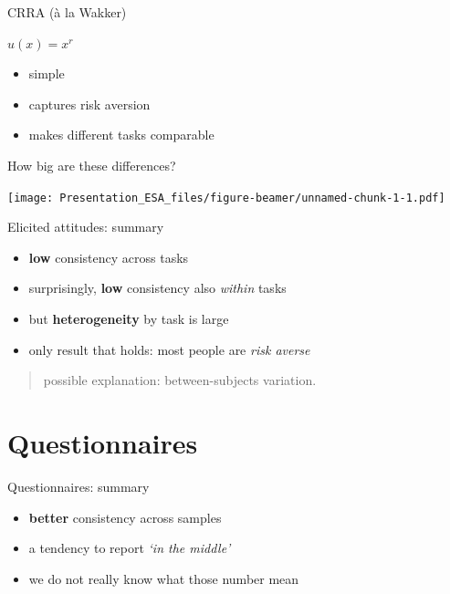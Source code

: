 \documentclass[
  ignorenonframetext,
]{beamer}
\providecommand{\tightlist}{%
  \setlength{\itemsep}{0pt}\setlength{\parskip}{0pt}}
\begin{document}
\begin{frame}{CRRA (à la Wakker)}
\protect\hypertarget{crra-uxe0-la-wakker}{}

\(u(x) = x^r\)

\begin{itemize}
\tightlist
\item
  simple
\item
  captures risk aversion
\item
  makes different tasks comparable
\end{itemize}

\end{frame}

\begin{frame}{How big are these differences?}
\protect\hypertarget{how-big-are-these-differences}{}

\texttt{[image: Presentation\_ESA\_files/figure-beamer/unnamed-chunk-1-1.pdf]}

\end{frame}

\begin{frame}{Elicited attitudes: summary}
\protect\hypertarget{elicited-attitudes-summary}{}

\begin{itemize}
\item
  \textbf{low} consistency across tasks
\item
  surprisingly, \textbf{low} consistency also \emph{within} tasks
\item
  but \textbf{heterogeneity} by task is large
\item
  only result that holds: most people are \emph{risk averse}
\end{itemize}

\begin{quote}
possible explanation: between-subjects variation.
\end{quote}

\end{frame}

\hypertarget{questionnaires}{%
\section{Questionnaires}\label{questionnaires}}

\begin{frame}{Questionnaires: summary}
\protect\hypertarget{questionnaires-summary}{}

\begin{itemize}
\item
  \textbf{better} consistency across samples
\item
  a tendency to report \emph{`in the middle'}
\item
  we do not really know what those number mean
\end{itemize}

\end{frame}
\end{document}
